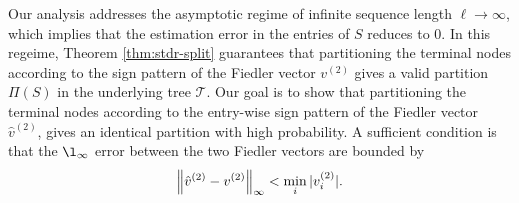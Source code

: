 

Our analysis addresses the asymptotic regime of infinite sequence length $\ell \to \infty$, which implies that the estimation error in the entries of $S$ reduces to $0$.
In this regeime, Theorem \ref{thm:stdr-split} guarantees that partitioning the terminal nodes according to the sign pattern of the Fiedler vector $v^{(2)}$ gives a valid partition $\Pi(S)$ in the underlying tree $\mathcal T$.
Our goal is to show that partitioning the terminal nodes according to the entry-wise sign pattern of the Fiedler vector $\hat v^{(2)}$, gives an identical partition with high probability. 
A sufficient condition is that the $\l_{\infty}$ error between the two Fiedler vectors are bounded by 
\begin{equation}\label{eq:entrywise}
   \left\lVert \hat v^{(2)}-v^{(2)} \right\rVert_\infty<\min_i|v^{(2)}_i|.
\end{equation}





